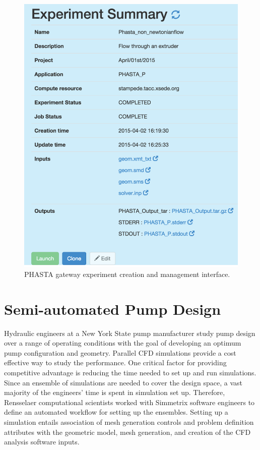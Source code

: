 \begin{figure}
  \includegraphics[height=0.4\textheight,keepaspectratio]{figures/experimentSummary.png}
  \caption{
    PHASTA gateway experiment creation and management interface.
  }
  \label{fig:createExperiment}
\end{figure}

\section{Semi-automated Pump Design}\label{sec:pumpdesign}

Hydraulic engineers at a New York State pump manufacturer study pump design over
a range of operating conditions with the goal of developing an optimum pump
configuration and geometry.
Parallel CFD simulations provide a cost effective
way to study the performance.
One critical factor for providing competitive advantage is reducing the time
needed to set up and run simulations.
Since an ensemble of simulations are needed to cover the design space, a
vast majority of the engineers' time is spent in simulation set up.
Therefore, Rensselaer computational scientists worked with Simmetrix software
engineers to define an automated workflow for setting up the ensembles.
Setting up a simulation entails association of mesh generation controls and problem
definition attributes with the geometric model, mesh generation, and creation of
the CFD analysis software inputs.


